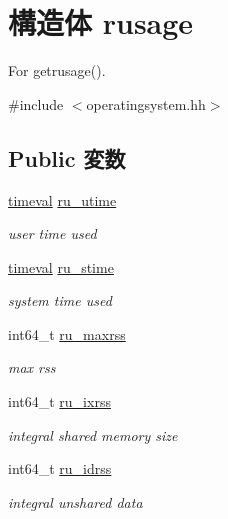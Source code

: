\hypertarget{structOperatingSystem_1_1rusage}{
\section{構造体 rusage}
\label{structOperatingSystem_1_1rusage}
}


For getrusage().  


{\ttfamily \#include $<$operatingsystem.hh$>$}\subsection*{Public 変数}
\begin{DoxyCompactItemize}
\item 
\hyperlink{structOperatingSystem_1_1timeval}{timeval} \hyperlink{structOperatingSystem_1_1rusage_a8215cefbae5cd231b1842dec70a931a4}{ru\_\-utime}
\begin{DoxyCompactList}\small\item\em user time used \item\end{DoxyCompactList}\item 
\hyperlink{structOperatingSystem_1_1timeval}{timeval} \hyperlink{structOperatingSystem_1_1rusage_a42bd947479e1d5cef57271c6702d7e09}{ru\_\-stime}
\begin{DoxyCompactList}\small\item\em system time used \item\end{DoxyCompactList}\item 
int64\_\-t \hyperlink{structOperatingSystem_1_1rusage_a67b085d370d7a42fec998a14f6ea1eab}{ru\_\-maxrss}
\begin{DoxyCompactList}\small\item\em max rss \item\end{DoxyCompactList}\item 
int64\_\-t \hyperlink{structOperatingSystem_1_1rusage_a13da5e5855b52e8b43ecd6c6d671708e}{ru\_\-ixrss}
\begin{DoxyCompactList}\small\item\em integral shared memory size \item\end{DoxyCompactList}\item 
int64\_\-t \hyperlink{structOperatingSystem_1_1rusage_a957d4290597d297f4fe76a7136182b75}{ru\_\-idrss}
\begin{DoxyCompactList}\small\item\em integral unshared data  \item\end{DoxyCompactList}\item 

\end{DoxyCompactItemize}
